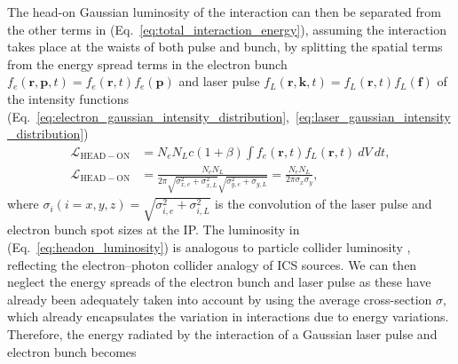 \documentclass[../main.tex]{subfiles}
\begin{document}
The head-on Gaussian luminosity of the interaction can then be separated from the other terms in (Eq.~\ref{eq:total_interaction_energy}), assuming the interaction takes place at the waists of both pulse and bunch, by splitting the spatial terms from the energy spread terms in the electron bunch $f_{e}\left(\mathbf{r},\mathbf{p},t\right) = f_{e}\left(\mathbf{r},t\right)f_{e}\left(\mathbf{p}\right)$ and laser pulse $f_{L}\left(\mathbf{r},\mathbf{k},t\right) = f_{L}\left(\mathbf{r},t\right)f_{L}\left(\mathbf{f}\right)$ of the intensity functions (Eq.~\ref{eq:electron_gaussian_intensity_distribution},~\ref{eq:laser_gaussian_intensity_distribution}) 
\begin{align}
\mathcal{L}_{\mathrm{HEAD-ON}} &= N_{e}N_{L}c\left(1+\beta\right)\int f_{e}\left(\mathbf{r},t\right)f_{L}\left(\mathbf{r},t\right)~dV~dt, \\
\mathcal{L}_{\mathrm{HEAD-ON}} &= \frac{N_{e}N_{L}}{2\pi\sqrt{\sigma_{x,e}^{2}+\sigma_{x,L}^{2}}\sqrt{\sigma_{y,e}^{2}+\sigma_{y,L}}} = \frac{N_{e}N_{L}}{2\pi\sigma_{x}\sigma_{y}},
\label{eq:headon_luminosity}
\end{align}
where $\sigma_{i}(i=x,y,z) = \sqrt{\sigma_{i,e}^{2}+\sigma_{i,L}^{2}}$ is the convolution of the laser pulse and electron bunch spot sizes at the IP. The luminosity in (Eq.~\ref{eq:headon_luminosity}) is analogous to particle collider luminosity \cite{herr2006concept,miyahara2008luminosity}, reflecting the electron--photon collider analogy of ICS sources. We can then neglect the energy spreads of the electron bunch and laser pulse as these have already been adequately taken into account by using the average cross-section $\sigma$, which already encapsulates the variation in interactions due to energy variations. Therefore, the energy radiated by the interaction of a Gaussian laser pulse and electron bunch becomes  
\end{document}
